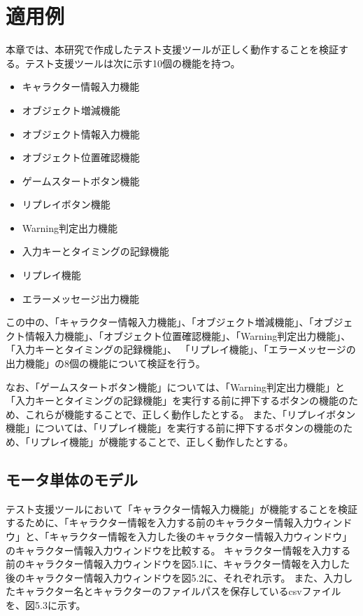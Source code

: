 \chapter{適用例}\label{cha:Indication}
本章では、本研究で作成したテスト支援ツールが正しく動作することを検証する。テスト支援ツールは次に示す10個の機能を持つ。

\begin{itemize}
	\item キャラクター情報入力機能
	\item オブジェクト増減機能
	\item オブジェクト情報入力機能
	\item オブジェクト位置確認機能
	\item ゲームスタートボタン機能
	\item リプレイボタン機能
	\item Warning判定出力機能
	\item 入力キーとタイミングの記録機能
	\item リプレイ機能
	\item エラーメッセージ出力機能
\end{itemize}

この中の、「キャラクター情報入力機能」、「オブジェクト増減機能」、「オブジェクト情報入力機能」、「オブジェクト位置確認機能」、「Warning判定出力機能」、「入力キーとタイミングの記録機能」、
「リプレイ機能」、「エラーメッセージの出力機能」の8個の機能について検証を行う。

なお、「ゲームスタートボタン機能」については、「Warning判定出力機能」と「入力キーとタイミングの記録機能」を実行する前に押下するボタンの機能のため、これらが機能することで、正しく動作したとする。
また、「リプレイボタン機能」については、「リプレイ機能」を実行する前に押下するボタンの機能のため、「リプレイ機能」が機能することで、正しく動作したとする。

\section{モータ単体のモデル}
テスト支援ツールにおいて「キャラクター情報入力機能」が機能することを検証するために、「キャラクター情報を入力する前のキャラクター情報入力ウィンドウ」と、「キャラクター情報を入力した後のキャラクター情報入力ウィンドウ」のキャラクター情報入力ウィンドウを比較する。
キャラクター情報を入力する前のキャラクター情報入力ウィンドウを図5.1に、キャラクター情報を入力した後のキャラクター情報入力ウィンドウを図5.2に、それぞれ示す。
また、入力したキャラクター名とキャラクターのファイルパスを保存しているcsvファイルを、図5.3に示す。

